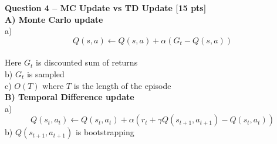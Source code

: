 \newpage
\textbf{\Large Question 4 -- MC Update vs TD Update \hfill [15 pts]} \\

\vspace{1.5cm}
\textbf{A) Monte Carlo update} \\
a) $$Q(s,a)  \leftarrow Q(s,a) + \alpha(G_t - Q(s,a)) $$ \\
\vspace{1.5cm}
Here $G_t$ is discounted sum of returns\\
b) $G_t$ is sampled\\
\vspace{1.5cm}
c) $O(T)$ where $T$ is the length of the episode \\
\textbf{B) Temporal Difference update} \\
a) $$Q(s_t,a_t) \leftarrow Q(s_t,a_t) + \alpha (r_t + \gamma Q(s_{t+1},a_{t+1}) - Q(s_t,a_t))$$
b) $Q(s_{t+1},a_{t+1})$ is bootstrapping
\vspace{0.5cm}

